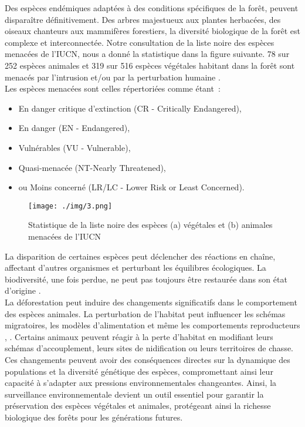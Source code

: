 Des espèces endémiques adaptées à des conditions spécifiques de la forêt, peuvent disparaître définitivement. Des arbres majestueux aux plantes herbacées, des oiseaux chanteurs aux mammifères forestiers, la diversité biologique de la forêt est complexe et interconnectée. Notre consultation de la liste noire des espèces menacées de l’IUCN, nous a donné la statistique dans la figure suivante. 78 sur 252 espèces animales et 319 sur 516 espèces végétales habitant dans la forêt sont menacés par l’intrusion et/ou par la perturbation humaine \cite{20}. 
\\

Les espèces menacées sont celles répertoriées comme étant :
\begin{itemize}
	\item En danger critique d'extinction (CR - Critically Endangered), 
	\item	En danger (EN - Endangered), 
	\item	Vulnérables (VU - Vulnerable), 
	\item	Quasi-menacée (NT-Nearly Threatened), 
	\item	ou Moins concerné (LR/LC - Lower Risk or Least Concerned).
\end{itemize}


\begin{figure}[H]
	\centering
	\texttt{[image: ./img/3.png]}
	\caption{Statistique de la liste noire des espèces (a) végétales et (b) animales menacées de l'IUCN}
\end{figure}

La disparition de certaines espèces peut déclencher des réactions en chaîne, affectant d'autres organismes et perturbant les équilibres écologiques. La biodiversité, une fois perdue, ne peut pas toujours être restaurée dans son état d'origine \cite{19}.
\\

La déforestation peut induire des changements significatifs dans le comportement des espèces animales. La perturbation de l'habitat peut influencer les schémas migratoires, les modèles d'alimentation et même les comportements reproducteurs \cite{21} , \cite{22}. Certains animaux peuvent réagir à la perte d'habitat en modifiant leurs schémas d'accouplement, leurs sites de nidification ou leurs territoires de chasse. Ces changements peuvent avoir des conséquences directes sur la dynamique des populations et la diversité génétique des espèces, compromettant ainsi leur capacité à s'adapter aux pressions environnementales changeantes. Ainsi, la surveillance environnementale devient un outil essentiel pour garantir la préservation des espèces végétales et animales, protégeant ainsi la richesse biologique des forêts pour les générations futures.
\\

